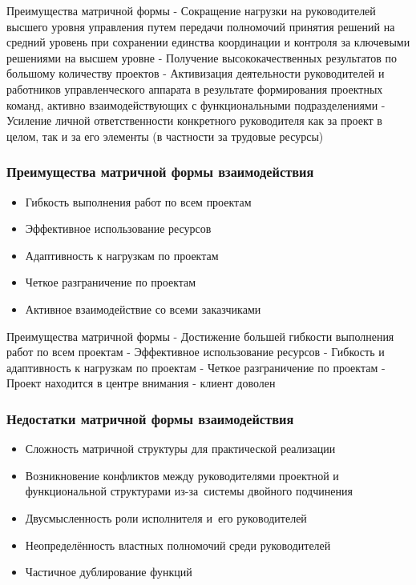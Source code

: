 \documentclass{../industrial-development}
\begin{document}
\lecturenotes
Преимущества матричной формы
- Сокращение нагрузки на руководителей высшего уровня управления путем передачи полномочий принятия решений на средний уровень при сохранении единства координации и контроля за ключевыми решениями на высшем уровне
- Получение высококачественных результатов по большому количеству проектов
- Активизация деятельности руководителей и работников управленческого аппарата в результате формирования проектных команд, активно взаимодействующих с функциональными подразделениями
- Усиление личной ответственности конкретного руководителя как за проект в целом, так и за его элементы (в частности за трудовые ресурсы)

\begin{frame} \frametitle{Преимущества матричной формы взаимодействия}
  
	\begin{itemize}
		\item Гибкость выполнения работ по всем проектам
		\item Эффективное использование ресурсов
		\item Адаптивность к нагрузкам по проектам
		\item Четкое разграничение по проектам
		\item Активное взаимодействие со всеми заказчиками
	\end{itemize}
\end{frame}

\lecturenotes
Преимущества матричной формы
- Достижение большей гибкости выполнения работ по всем проектам
- Эффективное использование ресурсов
- Гибкость и адаптивность к нагрузкам по проектам
- Четкое разграничение по проектам
- Проект находится в центре внимания - клиент доволен

\begin{frame} \frametitle{Недостатки матричной формы взаимодействия}
  
	\begin{itemize}
		\item Сложность матричной структуры для практической реализации
		\item Возникновение конфликтов между руководителями проектной и функциональной структурами из-за~системы двойного подчинения
		\item Двусмысленность роли исполнителя и~его руководителей
		\item Неопределённость властных полномочий среди руководителей
		\item Частичное дублирование функций
	\end{itemize}
\end{frame}
\end{document}
